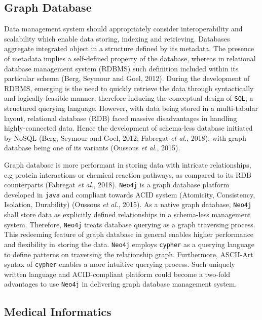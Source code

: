\documentclass[]{article}
\begin{document}
\hypertarget{graph-database}{%
\subsection{Graph Database}\label{graph-database}}

Data management system should appropriately consider interoperability
and scalability which enable data storing, indexing and retrieving.
Databases aggregate integrated object in a structure defined by its
metadata. The presence of metadata implies a self-defined property of
the database, whereas in relational database management system (RDBMS)
such definition included within its particular schema (Berg, Seymour and
Goel, 2012). During the development of RDBMS, emerging is the need to
quickly retrieve the data through syntactically and logically feasible
manner, therefore inducing the conceptual design of \texttt{SQL}, a
structured querying language. However, with data being stored in a
multi-tabular layout, relational database (RDB) faced massive
disadvantages in handling highly-connected data. Hence the development
of schema-less database initiated by NoSQL (Berg, Seymour and Goel,
2012; Fabregat \emph{et al.}, 2018), with graph database being one of
its variants (Oussous \emph{et al.}, 2015).

Graph database is more performant in storing data with intricate
relationships, e.g protein interactions or chemical reaction pathways,
as compared to its RDB counterparts (Fabregat \emph{et al.}, 2018).
\texttt{Neo4j} is a graph database platform developed in \texttt{java}
and compliant towards ACID system (Atomicity, Consistency, Isolation,
Durability) (Oussous \emph{et al.}, 2015). As a native graph database,
\texttt{Neo4j} shall store data as explicitly defined relationships in a
schema-less management system. Therefore, \texttt{Neo4j} treats database
querying as a graph traversing process. This redeeming feature of graph
database in general enables higher performance and flexibility in
storing the data. \texttt{Neo4j} employs \texttt{cypher} as a querying
language to define patterns on traversing the relationship graph.
Furthermore, ASCII-Art syntax of \texttt{cypher} enables a more
intuitive querying process. Such uniquely written language and
ACID-compliant platform could become a two-fold advantages to use
\texttt{Neo4j} in delivering graph database management system.

\hypertarget{medical-informatics}{%
\subsection{Medical Informatics}\label{medical-informatics}}
\end{document}
